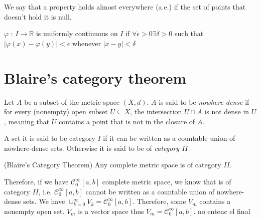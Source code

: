 \documentclass[../main.tex]{subfiles}
\begin{document}
\begin{definition}
We say that a property holds almost everywhere (a.e.) if the set of points that doesn’t hold it is null.
\end{definition}


\begin{definition} 
	$\varphi$ : $I \rightarrow \mathbb{R}$ is uniformly continuous on $I$ if $\forall \epsilon > 0 \exists \delta >0 $ such that $|\varphi(x)- \varphi(y)| < \epsilon$ whenever $|x-y|< \delta$
\end{definition}


\section{Blaire's category theorem}

\begin{definition} Let $A$ be a subset of the metric space $(X,d)$. $A$ is said to be \emph{nowhere dense} if for every (nonempty) open subset $U\subseteq X$, the intersection $U\cap\overline{A}$ is not dense in $U$, meaning that $U$ contains a point that is not in the closure of $A$.
\end{definition}
\begin{definition}
	A set it is said to be category $I$ if it can be written as a countable union of nowhere-dense sets. Otherwise it is said to be of \emph{category $II$}
\end{definition}
\begin{theorem} (Blaire's Category Theorem)
	Any complete metric space is of category $II$.
\end{theorem}
\noindent Therefore, if we have $\mathcal{C}_0^\infty[a,b]$ complete metric space, we know that is of category $II$, i.e. $\mathcal{C}_0^\infty[a,b]$  cannot be written as a countable union of nowhere-dense sets. We have $\cup_{k=0}^\infty V_k = \mathcal{C}_0^\infty[a,b]$. Therefore, some $V_m$ contains a nonempty open set. $V_m$ is a vector space thus $V_m=\mathcal{C}_0^\infty[a,b]$. no entenc el final
\end{document}
